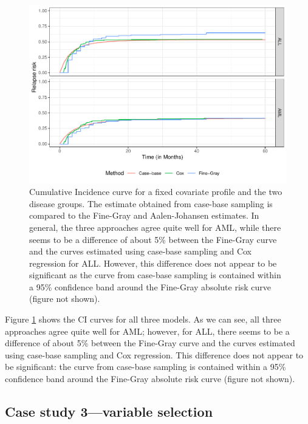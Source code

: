 \begin{figure}[ht]
\includegraphics[width=\textwidth,keepaspectratio=true]{./compAbsrisk-1} \caption{Cumulative Incidence curve for a fixed covariate profile and the two disease groups. The estimate obtained from case-base sampling is compared to the Fine-Gray and Aalen-Johansen estimates. In general, the three approaches agree quite well for AML, while there seems to be a difference of about 5\% between the Fine-Gray curve and the curves estimated using case-base sampling and Cox regression for ALL. However, this difference does not appear to be significant as the curve from case-base sampling is contained within a 95\% confidence band around the Fine-Gray absolute risk curve (figure not shown).}\label{fig:compAbsrisk}
\end{figure}

Figure \ref{fig:compAbsrisk} shows the CI curves for all three models. As we can see, all three approaches agree quite well for AML; however, for ALL, there seems to be a difference of about 5\% between the Fine-Gray curve and the curves estimated using case-base sampling and Cox regression. This difference does not appear to be significant: the curve from case-base sampling is contained within a 95\% confidence band around the Fine-Gray absolute risk curve (figure not shown).

\hypertarget{case-study-3variable-selection}{%
\subsection{Case study 3---variable selection}\label{case-study-3variable-selection}}

